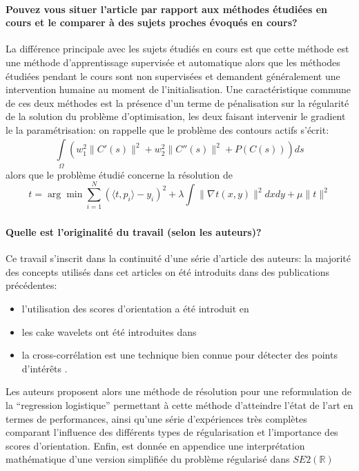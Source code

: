 \documentclass{article}
\begin{document}
\paragraph{Pouvez vous situer l'article par rapport aux méthodes étudiées en cours et le
comparer à des sujets proches évoqués en cours?} 
La différence principale avec les sujets étudiés en cours est que cette méthode est une
méthode d'apprentissage supervisée et automatique alors que les méthodes étudiées
pendant le cours sont non supervisées et demandent généralement une intervention humaine
au moment de l'initialisation.\newline
Une caractéristique commune de ces deux méthodes est la présence d'un terme de
pénalisation sur la régularité de la solution du problème d'optimisation, les deux
faisant intervenir le gradient le la paramétrisation: on rappelle que le problème des
contours actifs s'écrit:
\[
    \int\limits_{  \Omega }^{  } \left ( w_1^2 \|C'(s)\|^2 + w_2^2 \|C''(s)\|^2 +
    P(C(s)) \right )ds
\] 
alors que le problème étudié concerne la résolution de 
\[
    t = \arg \min_{  } \sum\limits_{ i=1 }^{ N } \left ( \langle t, p_i \rangle
    - y_i \right )^2 + \lambda \int\limits_{  }^{  } \| \nabla_{  } t(x, y) \|^2 dx dy + \mu \| t \|^2
    \label{eq.2} \tag{2}
\]
\paragraph{Quelle est l'originalité du travail (selon les auteurs)?}
Ce travail s'inscrit dans la continuité d'une  série d'article des auteurs: la majorité
des concepts utilisés dans cet articles on été introduits dans des publications
précédentes:
\begin{itemize}
  \item l'utilisation des scores d'orientation a été introduit en \cite{orientation-score}
  \item les cake wavelets ont été introduites dans \cite{cake}
  \item la cross-corrélation est une technique bien connue pour détecter des points
    d'intérêts \cite{cross-correlation}.
\end{itemize}
Les auteurs proposent alors une méthode de résolution pour une reformulation de la 
``regression logistique'' permettant à cette méthode d'atteindre l'état de l'art en
termes de performances, ainsi qu'une série d'expériences très complètes
comparant l'influence des différents types de régularisation et l'importance des
scores d'orientation. Enfin, est donnée en appendice une interprétation mathématique d'une
version simplifiée du problème régularisé dans $ SE2(\mathbb{R}) $
\end{document}

